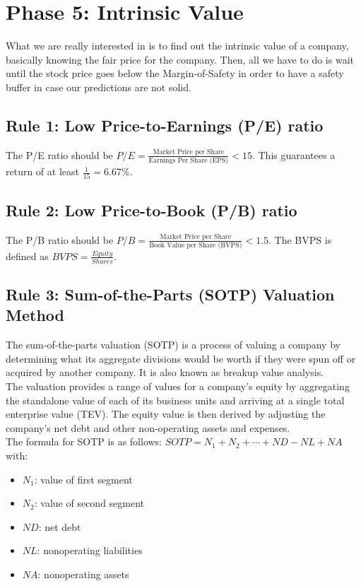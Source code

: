 \section{Phase 5: Intrinsic Value}

What we are really interested in is to find out the intrinsic value of a company,
basically knowing the fair price for the company. Then, all we have to do is 
wait until the stock price goes below the Margin-of-Safety in order to have a
safety buffer in case our predictions are not solid.

\subsection{Rule 1: Low Price-to-Earnings (P/E) ratio}

The P/E ratio should be $P/E = \frac{\text{Market Price per Share}}{\text{Earnings Per Share (EPS)}} < 15$.
This guarantees a return of at least $\frac{1}{15} = 6.67\%$.

\subsection{Rule 2: Low Price-to-Book (P/B) ratio}

The P/B ratio should be $P/B = \frac{\text{Market Price per Share}}{\text{Book Value per Share (BVPS)}} < 1.5$.
The BVPS is defined as $BVPS = \frac{Equity}{Shares}$.

\subsection{Rule 3: Sum-of-the-Parts (SOTP) Valuation Method}

The sum-of-the-parts valuation (SOTP) is a process of valuing a company by
determining what its aggregate divisions would be worth if they were spun off or
acquired by another company. It is also known as breakup value analysis.\\
The valuation provides a range of values for a company's equity by aggregating
the standalone value of each of its business units and arriving at a single
total enterprise value (TEV). The equity value is then derived by adjusting the
company's net debt and other non-operating assets and expenses.\\
The formula for SOTP is as follows: $SOTP = N_1 + N_2 + \cdots + ND - NL + NA$ with:
\begin{itemize}
    \item $N_1$: value of first segment
    \item $N_2$: value of second segment
    \item $ND$: net debt
    \item $NL$: nonoperating liabilities
    \item $NA$: nonoperating assets
\end{itemize}

